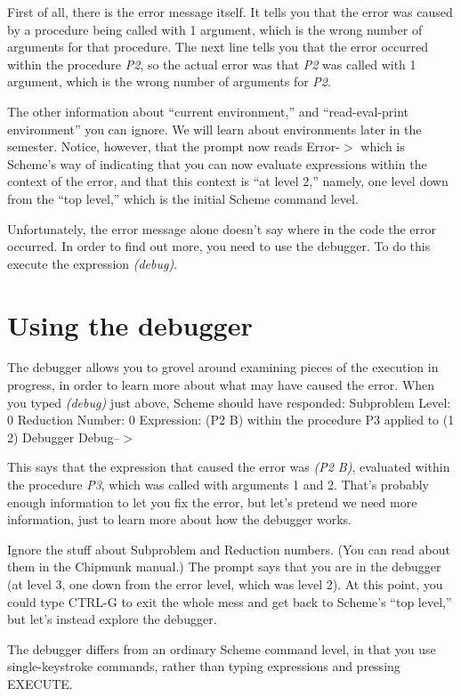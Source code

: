 First of all, there is the error message itself.  It tells you
that the error was caused by a procedure being called with 1
argument, which is the wrong number of arguments for that
procedure.  The next line tells you that the error occurred
within the procedure
{\it P2}, so the actual error was that {\it P2} was called with 1
argument, which is the wrong number of arguments for {\it P2}.

The other information about ``current environment,'' and
``read-eval-print environment'' you can ignore.  We will
learn about environments later in the semester.  Notice, however,
that the prompt now reads
 Error-$>$
\endlisp
\vpar
which is Scheme's way of indicating that you can now
evaluate expressions within the context of the error, and that
this context is ``at level 2,'' namely, one level down from the
``top level,'' which is the initial Scheme command level.

Unfortunately, the error message alone doesn't say where in
the code the error occurred.  In order to find out more, you need
to use the debugger.  To do this execute the expression {\it (debug)}.

\section{Using the debugger}

The debugger allows you to grovel around
examining pieces of the execution in progress, in order to learn
more about what may have caused the error.
When you typed {\it (debug)} just above, Scheme should have responded:
\beginlisp
Subproblem Level: 0  Reduction Number: 0
Expression:
(P2 B)
within the procedure P3
applied to (1 2)
Debugger
 Debug--$>$
\endlisp

This says that the expression that caused the error was
{\it (P2 B)}, evaluated within the procedure {\it P3}, which was
called with arguments 1 and 2.  That's probably enough
information to let you fix the error, but let's pretend we need
more information, just to learn more about how the debugger works.

Ignore the stuff about Subproblem and Reduction numbers.  (You can
read about them in the Chipmunk manual.)  The prompt says that you are
in the debugger (at level 3, one down from the error level, which was
level 2).  At this point, you could type CTRL-G to exit the whole
mess and get back to Scheme's ``top level,'' but let's instead explore
the debugger.

The debugger differs from an ordinary Scheme command level, in
that you use single-keystroke commands, rather than typing expressions
and pressing EXECUTE.


